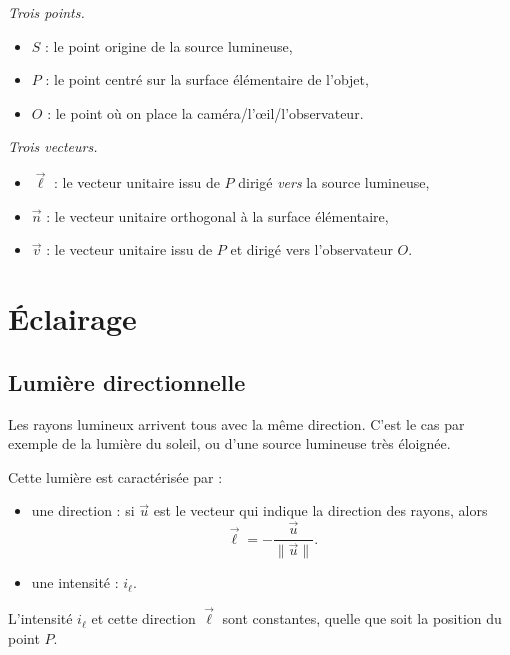 \documentclass[11pt,class=report,crop=false]{standalone}
\begin{document}
\emph{Trois points.}
\begin{itemize}
  \item $S$ : le point origine de la source lumineuse,
  \item $P$ : le point centré sur la surface élémentaire de l'objet,
  \item $O$ : le point où on place la caméra/l'\oe{}il/l'observateur.
\end{itemize}

\medskip
\emph{Trois vecteurs.}
\begin{itemize}
  \item $\vec \ell$ : le vecteur unitaire issu de $P$ dirigé \emph{vers} la source lumineuse,
  \item $\vec n$ : le vecteur unitaire orthogonal à la surface élémentaire,
  \item $\vec v$ : le vecteur unitaire issu de $P$ et dirigé vers l'observateur $O$.
\end{itemize}


\section{Éclairage}


\subsection{Lumière directionnelle}

Les rayons lumineux arrivent tous avec la même direction. C'est le cas par exemple de la lumière du soleil, ou d'une source lumineuse très éloignée.


Cette lumière est caractérisée par :
\begin{itemize}
  \item une direction : si $\vec u$ est le vecteur qui indique la direction des rayons, alors 
$$\vec\ell = -\frac{\vec u}{\|\vec u\|}.$$
  \item une intensité : $i_\ell$.
\end{itemize}
L'intensité $i_\ell$ et cette direction $\vec \ell $ sont constantes, quelle que soit la position du point $P$.


\end{document}
